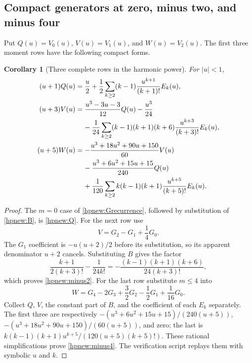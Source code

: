 \documentclass[11pt,a4paper]{article}
\numberwithin{equation}{section}
\newtheorem{corollary}[theorem]{Corollary}
\theoremstyle{definition}
\theoremstyle{remark}
\begin{document}
\subsection{Compact generators at zero, minus two, and minus four}

Put $Q(u)=V_0(u)$, $V(u)=V_1(u)$, and $W(u)=V_2(u)$.
The first three moment rows have the following compact forms.
\begin{corollary}[Three complete rows in the harmonic power]
\label{hpnew:threerows}
For $|u|<1$,
\begin{align}
 (u+1)Q(u)
 &=\frac u2+\frac12\sum_{k\ge2}(k-1)
                  \frac{u^{k+1}}{(k+1)!}E_k(u),\label{hpnew:Q}\\
 (u+3)V(u)
 &=\frac{u^3-3u-3}{12}Q(u)-\frac{u^3}{24}\notag\\
 &\hspace{4mm}-\frac1{24}\sum_{k\ge2}(k-1)(k+1)(k+6)
                  \frac{u^{k+3}}{(k+3)!}E_k(u),\label{hpnew:minus2}\\
 (u+5)W(u)
 &=-\frac{u^3+18u^2+90u+150}{60}V(u)\notag\\
 &\hspace{4mm}-\frac{u^3+6u^2+15u+15}{240}Q(u)\notag\\
 &\hspace{4mm}+\frac1{120}\sum_{k\ge2}k(k-1)(k+1)
                  \frac{u^{k+5}}{(k+5)!}E_k(u).
                                      \label{hpnew:minus4}
\end{align}
\end{corollary}

\begin{proof}
The $m=0$ case of \eqref{hpnew:Grecurrence}, followed by substitution
of \eqref{hpnew:B}, is \eqref{hpnew:Q}. For the next row use
\[
 V=G_2-G_1+\frac14G_0.
\]
The $G_1$ coefficient is $-u(u+2)/2$ before its substitution, so its
apparent denominator $u+2$ cancels. Substituting $B$ gives the factor
\[
 \frac{k+1}{2(k+3)!}-\frac1{24k!}
       =-\frac{(k-1)(k+1)(k+6)}{24(k+3)!},
\]
which proves \eqref{hpnew:minus2}.
For the last row substitute $m\le4$ into
\[
 W=G_4-2G_3+\frac32G_2-\frac12G_1+\frac1{16}G_0.
\]
Collect $Q$, $V$, the constant part of $B$, and the coefficient of
each $E_k$ separately. The first three are respectively
$-(u^3+6u^2+15u+15)/(240(u+5))$,
$-(u^3+18u^2+90u+150)/(60(u+5))$, and zero; the last is
$k(k-1)(k+1)u^{k+5}/(120(u+5)(k+5)!)$.
These rational simplifications prove \eqref{hpnew:minus4}. The
verification script replays them with symbolic $u$ and $k$.
\end{proof}
\end{document}
